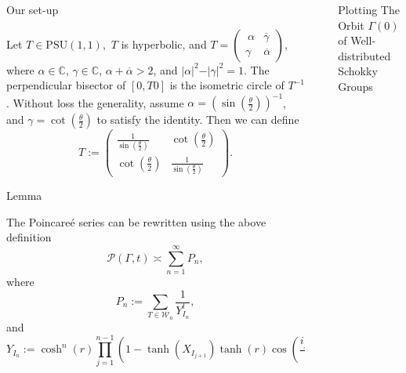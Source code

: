 \documentclass[final]{beamer}
\newlength{\sepwid}
\newlength{\onecolwid}
\newlength{\twocolwid}
\begin{document}
\begin{frame}[t]
\begin{columns}[t]
\begin{column}{\onecolwid}
\begin{block}{Our set-up}
\begin{footnotesize}
Let $T\in \text{PSU}(1,1),$ $T$ is hyperbolic, and $T=\begin{pmatrix}\
\alpha &  \overline{\gamma}\\
\gamma &  \overline{\alpha}
\end{pmatrix}$, where $\alpha\in\mathbb{C}$, $\gamma\in\mathbb{C}$, $\alpha+\overline{\alpha}>2$, and $\vert \alpha\vert^2- \vert \gamma\vert^2=1$. The perpendicular bisector of $[0,T0]$ is the isometric circle of $T^{-1}$. 
Without loss the generality, assume $\alpha=\left(\sin\left(\frac{\theta}{2}\right)\right)^{-1}$, and $\gamma=\cot\left(\frac{\theta}{2}\right)$ to satisfy the identity. 
Then we can define
$$
T:=\begin{pmatrix}
\frac{1}{\sin\left(\frac{\theta}{2}\right)} &  \cot\left(\frac{\theta}{2}\right) \\
\cot\left(\frac{\theta}{2}\right) &  \frac{1}{\sin\left(\frac{\theta}{2}\right)}
\end{pmatrix}.
$$
\end{footnotesize}
\end{block}


\begin{block}{Lemma}
\begin{footnotesize}
The Poincare\'{e} series can be rewritten using the above definition
$$
\mathcal{P}\left(\Gamma,t\right)\asymp \sum_{n=1}^\infty P_n,
$$
where $$
P_n:=\sum_{T\in\mathcal{W}_n}\frac{1}{Y_{I_n}^t},
$$
and $$
Y_{I_n}:=\cosh^n\left(r\right)\prod_{j=1}^{n-1}\left(1-\tanh\left(X_{I_{j+1}}\right)\tanh\left(r\right)\cos\left(\frac{i_{j+1}\pi}{m}-\theta_{I_j}\right)\right).
$$
\end{footnotesize}
\end{block}

\end{column}








\begin{column}{\sepwid}\end{column}%

\begin{column}{\onecolwid}%
\begin{block}{Plotting The Orbit $\Gamma(0)$ of Well-distributed Schokky Groups}
\begin{multicols}{3}


\end{multicols}
\end{block}
\end{column}
\end{columns}
\end{frame}
\end{document}

